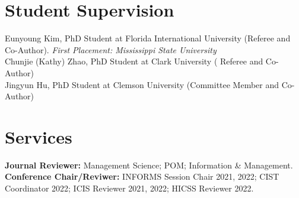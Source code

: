 \documentclass[margin,line]{resume}
\begin{document}
\begin{resume}


      \section{\mysidestyle Student Supervision} 
         Eunyoung Kim, PhD Student at Florida International University (Referee and Co-Author). \textit{First Placement: Mississippi State University} \\
         Chunjie (Kathy) Zhao, PhD Student at Clark University ( Referee and Co-Author)\\
         Jingyun Hu, PhD Student at Clemson University (Committee Member and Co-Author)

      \section{\mysidestyle Services} 
         \textbf{Journal Reviewer:} Management Science; POM; Information \& Management.\\
         \textbf{Conference Chair/Reviwer:} INFORMS Session Chair 2021, 2022; CIST Coordinator 2022; ICIS Reviewer 2021, 2022; HICSS Reviewer 2022.


\end{resume}
\end{document}
